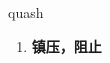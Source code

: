 
\begin{frame}
{\huge quash}
\begin{center}
\begin{enumerate}\Large
  \item \textbf{镇压，阻止}
\end{enumerate}
\end{center}
\end{frame}
